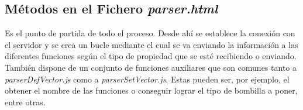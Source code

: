 \subsection{Métodos en el Fichero \textit{parser.html}}
Es el punto de partida de todo el proceso. Desde ahí se establece la conexión con el servidor y se crea un bucle mediante el cual se va enviando la información a las diferentes funciones según el tipo de propiedad que se esté recibiendo o enviando.
También dispone de un conjunto de funciones auxiliares que son comunes tanto a \textit{parserDefVector.js} como a \textit{parserSetVector.js}. Estas pueden ser, por ejemplo, el obtener el nombre de las funciones o conseguir lograr el tipo de bombilla a poner, entre otras.
